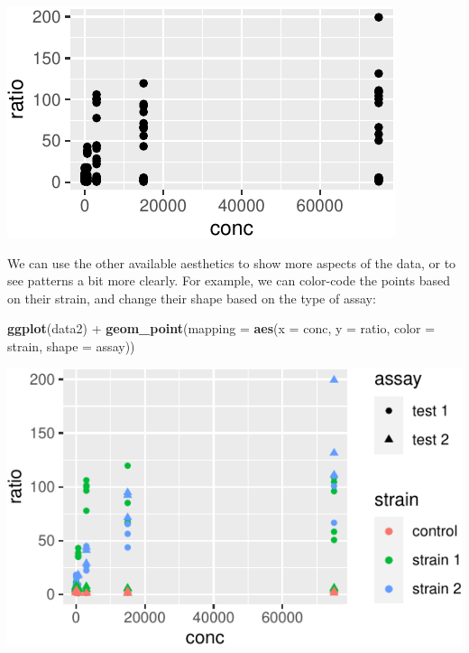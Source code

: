 \documentclass[]{book}
\newenvironment{Shaded}{}{}
\newcommand{\DataTypeTok}[1]{\textcolor[rgb]{0.56,0.13,0.00}{#1}}
\newcommand{\KeywordTok}[1]{\textcolor[rgb]{0.00,0.44,0.13}{\textbf{#1}}}
\newcommand{\NormalTok}[1]{#1}
\newcommand{\OperatorTok}[1]{\textcolor[rgb]{0.40,0.40,0.40}{#1}}
\newcommand{\StringTok}[1]{\textcolor[rgb]{0.25,0.44,0.63}{#1}}
\begin{document}
\begin{center}\includegraphics[width=\textwidth]{TRES-Tidy-Tutorial_files/figure-latex/unnamed-chunk-109-1} \end{center}

We can use the other available aesthetics to show more aspects of the data, or to see patterns a bit more clearly. For example, we can color-code the points based on their strain, and change their shape based on the type of assay:

\begin{Shaded}
\begin{Highlighting}[]
\KeywordTok{ggplot}\NormalTok{(data2) }\OperatorTok{+}
\StringTok{  }\KeywordTok{geom_point}\NormalTok{(}\DataTypeTok{mapping =} \KeywordTok{aes}\NormalTok{(}\DataTypeTok{x =}\NormalTok{ conc, }\DataTypeTok{y =}\NormalTok{ ratio, }\DataTypeTok{color =}\NormalTok{ strain, }\DataTypeTok{shape =}\NormalTok{ assay))}
\end{Highlighting}
\end{Shaded}

\begin{center}\includegraphics[width=\textwidth]{TRES-Tidy-Tutorial_files/figure-latex/unnamed-chunk-110-1} \end{center}
\end{document}
